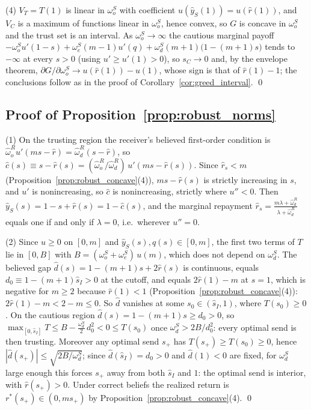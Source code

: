 \documentclass[11pt]{article}
\theoremstyle{plain}
\theoremstyle{remark}
\begin{document}
(4) $V_T=T(1)$ is linear in $\omega_o^S$ with coefficient $u(\hat y_S(1))=u(\hat r(1))$, and $V_C$ is a maximum of functions linear in $\omega_o^S$, hence convex, so $G$ is concave in $\omega_o^S$ and the trust set is an interval.  As $\omega_o^S\to\infty$ the cautious marginal payoff $-\omega_o^S u'(1-s)+\omega_e^S(m-1)u'(q)+\omega_d^S(m+1)\big(1-(m+1)s\big)$ tends to $-\infty$ at every $s>0$ (using $u'\ge u'(1)>0$), so $s_C\to0$ and, by the envelope theorem, $\partial G/\partial\omega_o^S\to u(\hat r(1))-u(1)$, whose sign is that of $\hat r(1)-1$; the conclusions follow as in the proof of Corollary~\ref{cor:greed_interval}.
\qed

\subsection*{Proof of Proposition~\ref{prop:robust_norms}}

(1) On the trusting region the receiver's believed first-order condition is $\hat\omega_o^{R}u'(ms-\hat r)=\hat\omega_d^{R}(s-\hat r)$, so $\hat c(s)\equiv s-\hat r(s)=(\hat\omega_o^{R}/\hat\omega_d^{R})\,u'(ms-\hat r(s))$.  Since $\hat r_s<m$ (Proposition~\ref{prop:robust_concave}(4)), $ms-\hat r(s)$ is strictly increasing in $s$, and $u'$ is nonincreasing, so $\hat c$ is nonincreasing, strictly where $u''<0$.  Then $\hat y_S(s)=1-s+\hat r(s)=1-\hat c(s)$, and the marginal repayment $\hat r_s=\frac{m\lambda+\hat\omega_d^{R}}{\lambda+\hat\omega_d^{R}}$ equals one if and only if $\lambda=0$, i.e.\ wherever $u''=0$.

(2) Since $u\ge0$ on $[0,m]$ and $\hat y_S(s),q(s)\in[0,m]$, the first two terms of $T$ lie in $[0,B]$ with $B=(\omega_o^S+\omega_e^S)\,u(m)$, which does not depend on $\omega_d^S$.  The believed gap $\hat d(s)=1-(m+1)s+2\hat r(s)$ is continuous, equals $d_0\equiv1-(m+1)\hat s_I>0$ at the cutoff, and equals $2\hat r(1)-m$ at $s=1$, which is negative for $m\ge2$ because $\hat r(1)<1$ (Proposition~\ref{prop:robust_concave}(4)): $2\hat r(1)-m<2-m\le0$.  So $\hat d$ vanishes at some $s_0\in(\hat s_I,1)$, where $T(s_0)\ge0$.  On the cautious region $\hat d(s)=1-(m+1)s\ge d_0>0$, so $\max_{[0,\hat s_I]}T\le B-\tfrac{\omega_d^S}2\,d_0^2<0\le T(s_0)$ once $\omega_d^S>2B/d_0^2$: every optimal send is then trusting.  Moreover any optimal send $s_+$ has $T(s_+)\ge T(s_0)\ge0$, hence $|\hat d(s_+)|\le\sqrt{2B/\omega_d^S}$; since $\hat d(\hat s_I)=d_0>0$ and $\hat d(1)<0$ are fixed, for $\omega_d^S$ large enough this forces $s_+$ away from both $\hat s_I$ and $1$: the optimal send is interior, with $\hat r(s_+)>0$.  Under correct beliefs the realized return is $r^\ast(s_+)\in(0,ms_+)$ by Proposition~\ref{prop:robust_concave}(4).
\qed
\end{document}
